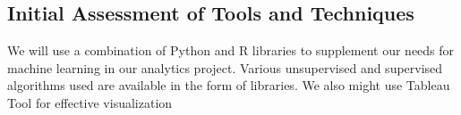 \documentclass{article}
\begin{document}
\subsection{Initial Assessment of Tools and Techniques}
We will use a combination of Python and R libraries to supplement our needs for machine learning in our analytics project. Various unsupervised and supervised algorithms used are available in the form of libraries. We also might use Tableau Tool for effective visualization
\end{document}
